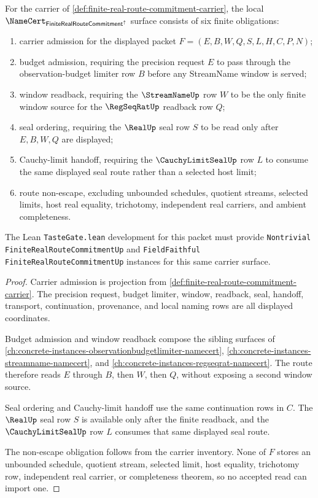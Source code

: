 \begin{theorem}
\label{thm:finite-real-route-commitment-namecert-obligations}
For the carrier of \autoref{def:finite-real-route-commitment-carrier}, the local $\NameCert_{\mathsf{FiniteRealRouteCommitment}^{\uparrow}}$ surface consists of six finite obligations:
\begin{enumerate}
\item carrier admission for the displayed packet $F=(E,B,W,Q,S,L,H,C,P,N)$;
\item budget admission, requiring the precision request $E$ to pass through the observation-budget limiter row $B$ before any StreamName window is served;
\item window readback, requiring the $\StreamNameUp$ row $W$ to be the only finite window source for the $\RegSeqRatUp$ readback row $Q$;
\item seal ordering, requiring the $\RealUp$ seal row $S$ to be read only after $E,B,W,Q$ are displayed;
\item Cauchy-limit handoff, requiring the $\CauchyLimitSealUp$ row $L$ to consume the same displayed seal route rather than a selected host limit;
\item route non-escape, excluding unbounded schedules, quotient streams, selected limits, host real equality, trichotomy, independent real carriers, and ambient completeness.
\end{enumerate}
The Lean \texttt{TasteGate.lean} development for this packet must provide \texttt{Nontrivial FiniteRealRouteCommitmentUp} and \texttt{FieldFaithful FiniteRealRouteCommitmentUp} instances for this same carrier surface.
\end{theorem}
\begin{proof}
Carrier admission is projection from \autoref{def:finite-real-route-commitment-carrier}. The precision request, budget limiter, window, readback, seal, handoff, transport, continuation, provenance, and local naming rows are all displayed coordinates.

Budget admission and window readback compose the sibling surfaces of \autoref{ch:concrete-instances-observationbudgetlimiter-namecert}, \autoref{ch:concrete-instances-streamname-namecert}, and \autoref{ch:concrete-instances-regseqrat-namecert}. The route therefore reads $E$ through $B$, then $W$, then $Q$, without exposing a second window source.

Seal ordering and Cauchy-limit handoff use the same continuation rows in $C$. The $\RealUp$ seal row $S$ is available only after the finite readback, and the $\CauchyLimitSealUp$ row $L$ consumes that same displayed seal route.

The non-escape obligation follows from the carrier inventory. None of $F$ stores an unbounded schedule, quotient stream, selected limit, host equality, trichotomy row, independent real carrier, or completeness theorem, so no accepted read can import one.
\end{proof}


